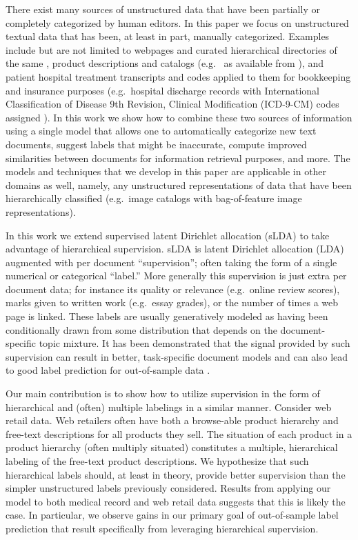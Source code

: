 There exist many sources of unstructured data that have been partially or completely categorized by human editors.  In this paper we focus on unstructured textual data that has been, at least in part, manually categorized.  Examples include but are not limited to webpages and curated hierarchical directories of the same \citep{DMOZ}, product descriptions and catalogs (e.g.~\citep{AMAZON} as available from \citep{SNAP}), and patient hospital treatment transcripts and  codes applied to them for bookkeeping and insurance purposes (e.g.~hospital discharge records with International Classification of Disease 9th Revision,
Clinical Modification (ICD-9-CM) codes assigned \cite{ICD9}).  In this work we show how to combine these two sources of information using a single model that allows one to automatically categorize new text documents, suggest labels that might be inaccurate, compute improved similarities between documents for information retrieval purposes, and more.  The models and techniques that we develop in this paper are applicable in other domains as well, namely, any unstructured representations of data that have been hierarchically classified (e.g.~image catalogs with bag-of-feature image representations). 

In this work we extend supervised latent Dirichlet allocation (sLDA) \cite{BleiMcAuliffe2008} to take advantage of hierarchical supervision.  sLDA is latent Dirichlet allocation (LDA) \cite{Blei2003} augmented with per document ``supervision'';  often taking the form of a single numerical or categorical ``label.''  More generally this supervision is just extra per document data;  for instance its quality or relevance (e.g.~online review scores), marks given to written work (e.g.~essay grades), or the number of times a web page is linked.  These labels are usually generatively modeled as having been conditionally drawn from some distribution that depends on the document-specific topic mixture.  It has been demonstrated that the signal provided by such supervision can result in better, task-specific document models and can also lead to good label prediction for out-of-sample data \cite{BleiMcAuliffe2008}.

Our main contribution is to show how to utilize supervision in the form of  hierarchical and (often) multiple labelings in a similar manner.   Consider web retail data.  Web retailers often have both a browse-able product hierarchy and free-text descriptions for all products they sell.   The situation of each product in a product hierarchy (often multiply situated) constitutes a multiple, hierarchical labeling of the free-text product descriptions.  We hypothesize that such hierarchical labels should, at least in theory, provide better supervision than the simpler unstructured labels previously considered.  Results from applying our model to both medical record and web retail data suggests that this is likely the case.  In particular, we observe gains in our primary goal of out-of-sample label prediction that result specifically from leveraging hierarchical supervision. 


